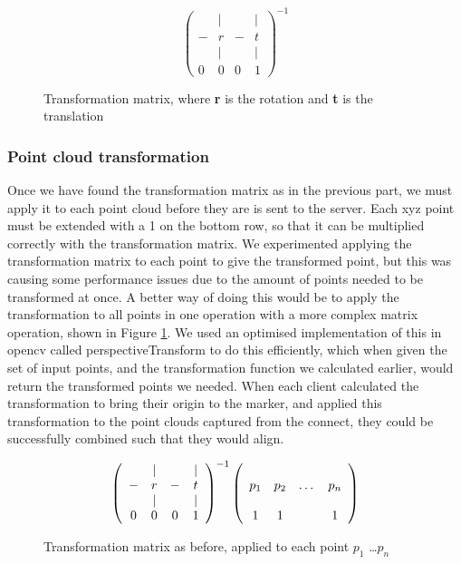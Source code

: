\documentclass{article}
\begin{document}
\begin{figure}[h]
  \[\left(\begin{array}{cccc}
      & | &   & | \\
    - & r & - & t \\ 
      & | &   & | \\
    0 & 0 & 0 & 1
    \end{array}\right)^{-1}\]
  \caption{Transformation matrix, where \textbf{r} is the rotation and \textbf{t} is the translation}
  \label{fig:transformationMatrix}
\end{figure}
\subsubsection{Point cloud transformation}
Once we have found the transformation matrix as in the previous part, we must apply it to each point cloud before they are is sent to the server. Each xyz point must be extended with a 1 on the bottom row, so that it can be multiplied correctly with the transformation matrix. We experimented applying the transformation matrix to each point to give the transformed point, but this was causing some performance issues due to the amount of points needed to be transformed at once. A better way of doing this would be to apply the transformation to all points in one operation with a more complex matrix operation, shown in Figure \ref{fig:transformationMatrix}. We used an optimised implementation of this in opencv called perspectiveTransform to do this efficiently, which when given the set of input points, and the transformation function we calculated earlier, would return the transformed points we needed. When each client calculated the transformation to bring their origin to the marker, and applied this transformation to the point clouds captured from the connect, they could be successfully combined such that they would align.\\
\begin{figure}[h]
  \[\left(\begin{array}{cccc}
      & | &   & | \\
    - & r & - & t \\ 
      & | &   & | \\
    0 & 0 & 0 & 1
    \end{array}\right)^{-1}
  \left(\begin{array}{cccc}
    \multirow{3}{*}{\textbf{$p_1$}} & \multirow{3}{*}{\textbf{$p_2$}} & \multirow{3}{*}{\dots} & \multirow{3}{*}{\textbf{$p_n$}} \\
    & & & \\
    & & & \\
    1 & 1 & & 1
    \end{array}\right)\]
  \caption{Transformation matrix as before, applied to each point $p_1$ \dots $p_n$}
  \label{fig:transformationApplication}
\end{figure}
\end{document}
